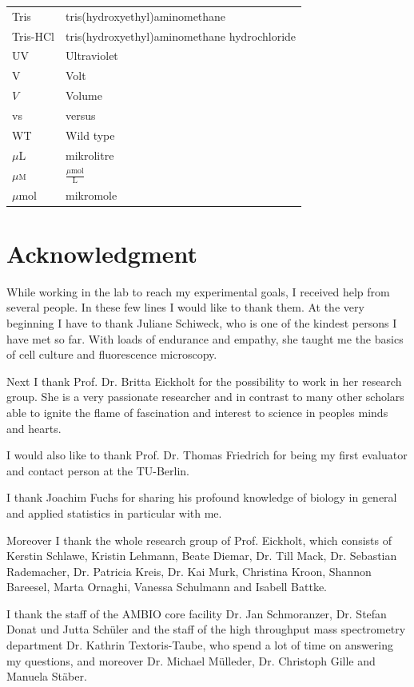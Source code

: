 \documentclass[a4paper,11pt,bibtotocnumbered]{article}
\begin{document}
\begin{small}
\begin{longtabu}{p{3cm}X}
Tris&tris(hydroxyethyl)aminomethane\\
Tris-HCl&tris(hydroxyethyl)aminomethane hydrochloride\\
UV & Ultraviolet\\
V & Volt\\
$V$&Volume\\
vs & versus\\
WT & Wild type\\
$\mu$L & mikrolitre\\
$\mu$\textsc{m} & $\frac{\mu\mathrm{mol}}{\mathrm{L}}$\\
$\mu$mol & mikromole\\
\end{longtabu}


\end{small}
\newpage
\listoffigures
\newpage
\listoftables
\newpage


\section{Acknowledgment}

While working in the lab to reach my experimental goals, I received help from several people. In these few lines I would like to thank them. At the very beginning I have to thank Juliane Schiweck, who is one of the kindest persons I have met so far. With loads of endurance and empathy, she taught me the basics of cell culture and fluorescence microscopy.  

Next I thank Prof. Dr. Britta Eickholt for the possibility to work in her research group. She is a very passionate researcher and in contrast to many other scholars able to ignite the flame of fascination and interest to science in peoples minds and hearts.

I would also like to thank Prof. Dr. Thomas Friedrich for being my first evaluator and contact person at the TU-Berlin.

I thank Joachim Fuchs for sharing his profound knowledge of biology in general and applied statistics in particular with me.

Moreover I thank the whole research group of Prof. Eickholt, which consists of Kerstin Schlawe, Kristin Lehmann, Beate Diemar, Dr. Till Mack, Dr. Sebastian Rademacher, Dr. Patricia Kreis, Dr. Kai Murk, Christina Kroon, Shannon Bareesel, Marta Ornaghi, Vanessa Schulmann and Isabell Battke. 

I thank the staff of the AMBIO core facility Dr. Jan Schmoranzer, Dr. Stefan Donat und Jutta Schüler and the staff of the high throughput mass spectrometry department Dr. Kathrin Textoris-Taube, who spend a lot of time on answering my questions, and moreover Dr. Michael Mülleder, Dr. Christoph Gille and Manuela Stäber.
\end{document}
